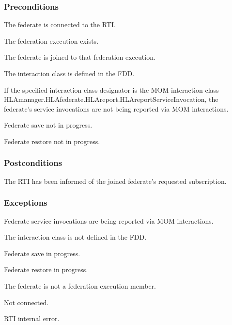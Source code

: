\begin{compactstdpage}
    \subsubsection{Preconditions}
    \begin{stdalphalist}
        \item The federate is connected to the RTI.
        \item The federation execution exists.
        \item The federate is joined to that federation execution.
        \item The interaction class is defined in the FDD.
        \item If the specified interaction class designator is the MOM interaction class HLAmanager.\allowbreak HLAfederate.\allowbreak HLAreport.\allowbreak HLAreportServiceInvocation, the federate's service invocations are not being reported via MOM interactions.
        \item Federate save not in progress.
        \item Federate restore not in progress.
    \end{stdalphalist}

    \subsubsection{Postconditions}
    \begin{stdalphalist}
        \item The RTI has been informed of the joined federate's requested subscription.
    \end{stdalphalist}

    \subsubsection{Exceptions}
    \begin{stdalphalist}
        \item Federate service invocations are being reported via MOM interactions.
        \item The interaction class is not defined in the FDD.
        \item Federate save in progress.
        \item Federate restore in progress.
        \item The federate is not a federation execution member.
        \item Not connected.
        \item RTI internal error.
    \end{stdalphalist}
\end{compactstdpage}

